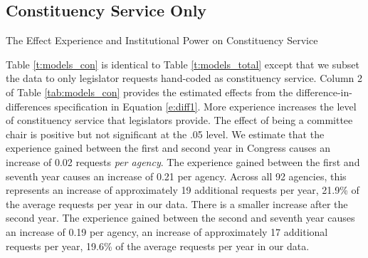  




\subsection{Constituency Service Only}

\begin{table}[hbt!]
\caption{The Effect Experience and Institutional Power on Constituency Service} \label{t:models_con}
\begin{minipage}{\textwidth}
\begin{center}
\end{center}
\end{minipage}
\end{table}

Table \ref{t:models_con} is identical to Table \ref{t:models_total} except that we subset the data to only legislator requests hand-coded as constituency service. 
Column 2 of Table \ref{tab:models_con} provides the estimated effects from the difference-in-differences specification in Equation \ref{e:diff1}. More experience increases the level of constituency service that legislators provide. The effect of being a committee chair is positive but not significant at the .05 level. We estimate that the experience gained between the first and second year in Congress causes an increase of 0.02 requests \textit{per agency}. The experience gained between the first and seventh year causes an increase of 0.21 per agency. Across all 92 agencies, this represents an increase of approximately 19 additional requests per year, 21.9\% of the average requests per year in our data. There is a smaller increase after the second year. The experience gained between the second and seventh year causes an increase of 0.19 per agency, an increase of approximately 17 additional requests per year, 19.6\% of the average requests per year in our data.


